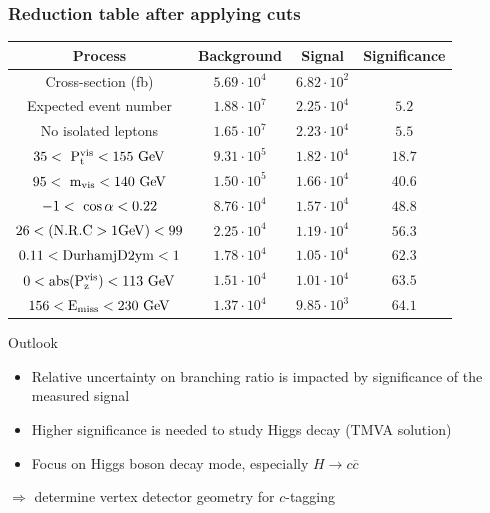 \documentclass{beamer}
\begin{document}
\begin{frame}
    \frametitle{Reduction table after applying cuts}

    \centering 
    \footnotesize{ 
                \begin{tabular}{c c c c}
      \hline
      Process                                     & Background          & Signal              & Significance  \tabularnewline
      \hline
      \hline
      Cross-section (fb)                          & $5.69 \cdot 10^{4}$ & $6.82 \cdot 10^{2}$ &               \tabularnewline
      \hline
      Expected event number                       & $1.88 \cdot 10^{7}$ & $2.25 \cdot 10^{4}$ & $5.2$         \tabularnewline
      No isolated leptons                         & $1.65 \cdot 10^{7}$ & $2.23 \cdot 10^{4}$ & $5.5$         \tabularnewline
      {$35 <~\rm{{P}_{t}^{vis}} < 155~\rm{GeV} $} & $9.31 \cdot 10^{5}$ & $1.82 \cdot 10^{4}$ & $18.7$        \tabularnewline
      {$95 <~\rm{m_{vis}}< 140~\rm{GeV}$}         & $1.50 \cdot 10^{5}$ & $1.66 \cdot 10^{4}$ & $40.6$        \tabularnewline
      {$-1 <~\rm{\cos{\alpha}}< 0.22$}            & $8.76 \cdot 10^{4}$ & $1.57 \cdot 10^{4}$ & $48.8$        \tabularnewline
      $26 < (\rm{N.R.C > 1GeV}) < 99$             & $2.25 \cdot 10^{4}$ & $1.19 \cdot 10^{4}$ & $56.3$        \tabularnewline
      $0.11 < \rm{DurhamjD2ym} < 1$               & $1.78 \cdot 10^{4}$ & $1.05 \cdot 10^{4}$ & $62.3$        \tabularnewline
      $0 < \rm{abs(P_{z}^{vis})} < 113~\rm{GeV}$& $1.51 \cdot 10^{4}$ & $1.01 \cdot 10^{4}$ & $63.5$        \tabularnewline
      $156 < \rm{E_{miss}} < 230~\rm{GeV}$   & $1.37 \cdot 10^{4}$ & $9.85 \cdot 10^{3}$ & $64.1$        \tabularnewline      
      \hline %
    \end{tabular}
   }
   \vspace{-0.15cm}
   \begin{block}{Outlook}
     \begin{itemize}
       \item Relative uncertainty on branching ratio is impacted by significance of the measured signal
       \item Higher significance is needed to study Higgs decay (TMVA solution)
       \item Focus on Higgs boson decay mode, especially $H \rightarrow c \overline{c}$ 
     \end{itemize}
     \vspace{-0.2cm}
     \centering
     $\Rightarrow$ determine vertex detector geometry for $c$-tagging    
   \end{block}

\end{frame}
\end{document}
